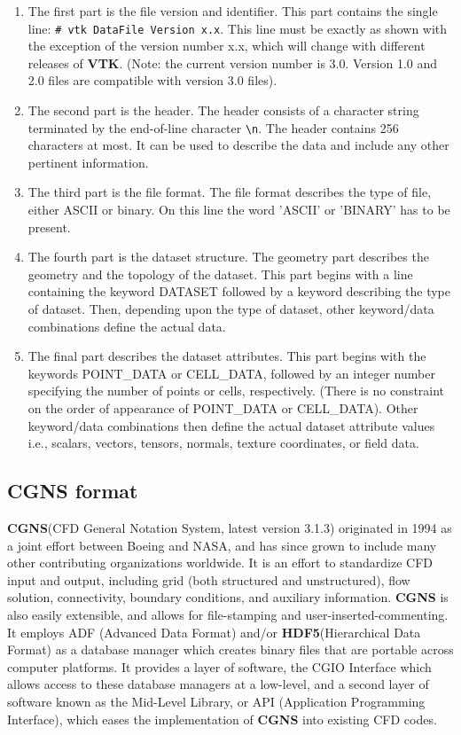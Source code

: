 \documentclass[a4paper,10pt]{article}
\newcommand{\vtk}{\textbf{VTK}\xspace}
\newcommand{\cgns}{\textbf{CGNS}\xspace}
\newcommand{\hdf}{\textbf{HDF5}\xspace}
\begin{document}
\begin{enumerate}
\setlength{\itemsep}{1pt}
\setlength{\parskip}{0pt}
\setlength{\parsep}{0pt}
\item The first part is the file version and identifier. This part contains the single line: \verb+# vtk DataFile Version x.x+.
This line must be exactly as shown with the exception of the version number x.x, which will change with different
releases of \vtk. (Note: the current version number is 3.0. Version 1.0 and 2.0 files are compatible with version 3.0 files).
\item The second part is the header. The header consists of a character string terminated by the end-of-line character \verb+\n+. The
header contains 256 characters at most. It can be used to describe the data and include any other pertinent information.
\item The third part is the file format. The file format describes the type of file, either ASCII or binary. 
On this line the word 'ASCII' or 'BINARY' has to be present.
\item The fourth part is the dataset structure. The geometry part describes the geometry and the topology of the dataset. This
part begins with a line containing the keyword DATASET followed by a keyword describing the type of dataset.
Then, depending upon the type of dataset, other keyword/data combinations define the actual data.
\item The final part describes the dataset attributes. This part begins with the keywords POINT\_DATA or CELL\_DATA, 
followed by an integer number specifying the number of points or cells, respectively. (There is no constraint on the order of 
appearance of POINT\_DATA or CELL\_DATA). Other keyword/data combinations then define the actual dataset attribute
values i.e., scalars, vectors, tensors, normals, texture coordinates, or field data.
\end{enumerate}

\subsection{\cgns format\cite{cgns}}

\cgns (CFD General Notation System, latest version 3.1.3) originated in 1994 as a joint effort between Boeing and NASA, 
and has since grown to include many other contributing organizations worldwide. It is an effort 
to standardize CFD input and output, including grid (both structured and unstructured), 
flow solution, connectivity, boundary conditions, and auxiliary information. \cgns is also easily extensible, 
and allows for file-stamping and user-inserted-commenting. It employs ADF (Advanced Data Format) 
and/or \hdf (Hierarchical Data Format) as a database manager which creates binary files that are 
portable across computer platforms. It provides a layer of software, the CGIO Interface which 
allows access to these database managers at a low-level, and a second layer of software known 
as the Mid-Level Library, or API (Application Programming Interface), 
which eases the implementation of \cgns into existing CFD codes. 
\end{document}
